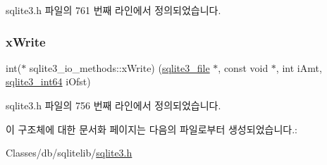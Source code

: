 sqlite3.\+h 파일의 761 번째 라인에서 정의되었습니다.

\mbox{\label{structsqlite3__io__methods_a659f6a40777b685c6a6b80e5f07a3328}} 
\subsubsection{\texorpdfstring{x\+Write}{xWrite}}
{\footnotesize\ttfamily int($\ast$ sqlite3\+\_\+io\+\_\+methods\+::x\+Write) (\hyperlink{structsqlite3__file}{sqlite3\+\_\+file} $\ast$, const void $\ast$, int i\+Amt, \hyperlink{sqlite3_8h_a0a4d3e6c1ad46f90e746b920ab6ca0d2}{sqlite3\+\_\+int64} i\+Ofst)}



sqlite3.\+h 파일의 756 번째 라인에서 정의되었습니다.



이 구조체에 대한 문서화 페이지는 다음의 파일로부터 생성되었습니다.\+:\begin{DoxyCompactItemize}
\item 
Classes/db/sqlitelib/\hyperlink{sqlite3_8h}{sqlite3.\+h}\end{DoxyCompactItemize}
